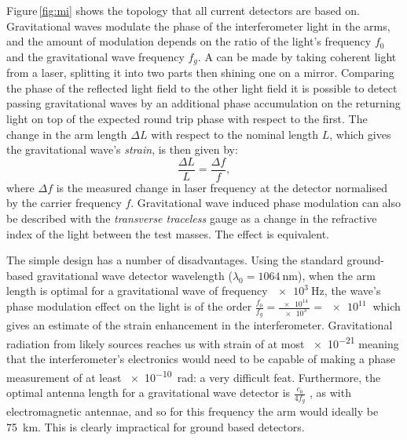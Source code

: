 Figure\,\ref{fig:mi} shows the \MI{} topology that all current detectors are based on. Gravitational waves modulate the phase of the interferometer light in the arms, and the amount of modulation depends on the ratio of the light's frequency $f_0$ and the gravitational wave frequency $f_g$. A \MI{} can be made by taking coherent light from a laser, splitting it into two parts then shining one on a mirror. Comparing the phase of the reflected light field to the other light field it is possible to detect passing gravitational waves by an additional phase accumulation on the returning light on top of the expected round trip phase with respect to the first. The change in the arm length $\Delta L$ with respect to the nominal length $L$, which gives the gravitational wave's \emph{strain}, is then given by:
\begin{equation}
  \label{eq:freq-to-length}
  \frac{\Delta L}{L} = \frac{\Delta f}{f},
\end{equation}
where $\Delta f$ is the measured change in laser frequency at the detector normalised by the carrier frequency $f$. Gravitational wave induced phase modulation can also be described with the \emph{transverse traceless} gauge as a change in the refractive index of the light between the test masses. The effect is equivalent.

The simple \MI{} design has a number of disadvantages. Using the standard ground-based gravitational wave detector wavelength ($\lambda_0 = \SI{1064}{\nano\meter}$), when the arm length is optimal for a gravitational wave of frequency $\SI{e3}{\hertz}$, the wave's phase modulation effect on the light is of the order $\frac{f_0}{f_g} = \frac{\SI{e14}{}}{\SI{e3}{}} = \SI{e11}{}$ which gives an estimate of the strain enhancement in the interferometer. Gravitational radiation from likely sources reaches us with strain of at most \SI{e-21}{} meaning that the interferometer's electronics would need to be capable of making a phase measurement of at least \SI{e-10}{\radian}: a very difficult feat. Furthermore, the optimal antenna length for a gravitational wave detector is $\frac{c_0}{4 f_g}$ \cite{Abbott2016a}, as with electromagnetic antennae, and so for this frequency the arm would ideally be \SI{75}{\kilo\meter}. This is clearly impractical for ground based detectors.

